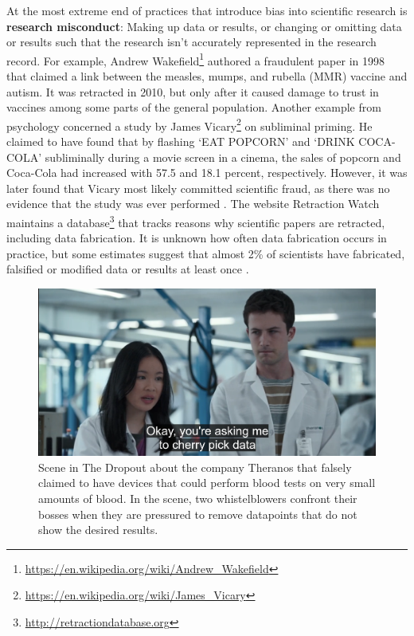 \documentclass[
  oneside]{krantz}
\renewcommand{\href}[2]{#2\footnote{\url{#1}}}
\begin{document}
At the most extreme end of practices that introduce bias into scientific research is \textbf{research misconduct}: Making up data or results, or changing or omitting data or results such that the research isn't accurately represented in the research record. For example, \href{https://en.wikipedia.org/wiki/Andrew_Wakefield}{Andrew Wakefield} authored a fraudulent paper in 1998 that claimed a link between the measles, mumps, and rubella (MMR) vaccine and autism. It was retracted in 2010, but only after it caused damage to trust in vaccines among some parts of the general population. Another example from psychology concerned a study by \href{https://en.wikipedia.org/wiki/James_Vicary}{James Vicary} on subliminal priming. He claimed to have found that by flashing `EAT POPCORN' and `DRINK COCA-COLA' subliminally during a movie screen in a cinema, the sales of popcorn and Coca-Cola had increased with 57.5 and 18.1 percent, respectively. However, it was later found that Vicary most likely committed scientific fraud, as there was no evidence that the study was ever performed \citep{rogers_how_1992}. The website Retraction Watch maintains a \href{http://retractiondatabase.org}{database} that tracks reasons why scientific papers are retracted, including data fabrication. It is unknown how often data fabrication occurs in practice, but some estimates suggest that almost 2\% of scientists have fabricated, falsified or modified data or results at least once \citep{fanelli_how_2009}.



\begin{figure}

{\centering \includegraphics[width=1\linewidth]{images/dropout_outlier} 

}

\caption{Scene in The Dropout about the company Theranos that falsely claimed to have devices that could perform blood tests on very small amounts of blood. In the scene, two whistelblowers confront their bosses when they are pressured to remove datapoints that do not show the desired results.}\label{fig:outliers}
\end{figure}
\end{document}
